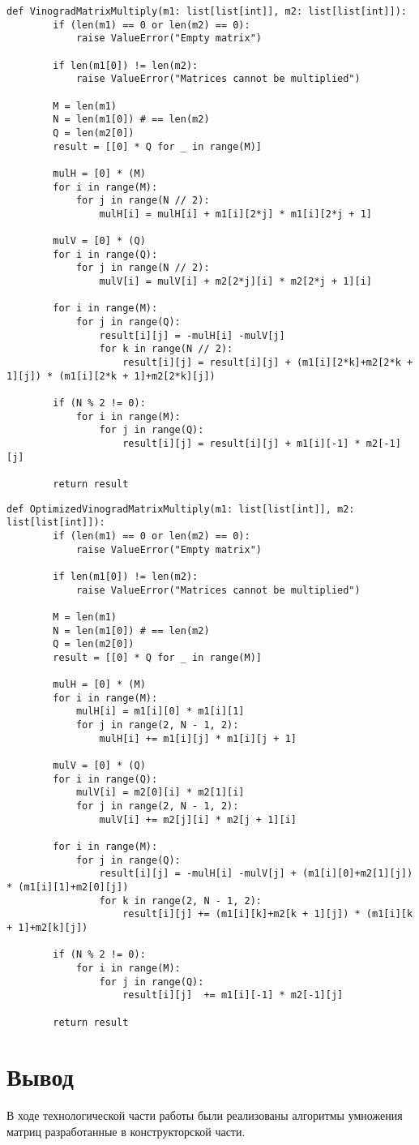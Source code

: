 \begin{lstlisting}[label=vinpy,caption={Алгоритм умножения матриц Винограда}]
	def VinogradMatrixMultiply(m1: list[list[int]], m2: list[list[int]]):
		if (len(m1) == 0 or len(m2) == 0):
			raise ValueError("Empty matrix")
		
		if len(m1[0]) != len(m2):
			raise ValueError("Matrices cannot be multiplied")
		
		M = len(m1)
		N = len(m1[0]) # == len(m2)
		Q = len(m2[0])
		result = [[0] * Q for _ in range(M)]
		
		mulH = [0] * (M)
		for i in range(M):
			for j in range(N // 2):
				mulH[i] = mulH[i] + m1[i][2*j] * m1[i][2*j + 1]
		
		mulV = [0] * (Q)
		for i in range(Q):
			for j in range(N // 2):
				mulV[i] = mulV[i] + m2[2*j][i] * m2[2*j + 1][i]
		
		for i in range(M):
			for j in range(Q):
				result[i][j] = -mulH[i] -mulV[j]
				for k in range(N // 2):
					result[i][j] = result[i][j] + (m1[i][2*k]+m2[2*k + 1][j]) * (m1[i][2*k + 1]+m2[2*k][j])
		
		if (N % 2 != 0):
			for i in range(M):
				for j in range(Q):
					result[i][j] = result[i][j] + m1[i][-1] * m2[-1][j]
		
		return result
\end{lstlisting}

\begin{lstlisting}[label=ovinpy,caption={Оптимизированный алгоритм умножения матриц Винограда}]
	def OptimizedVinogradMatrixMultiply(m1: list[list[int]], m2: list[list[int]]):
		if (len(m1) == 0 or len(m2) == 0):
			raise ValueError("Empty matrix")
		
		if len(m1[0]) != len(m2):
			raise ValueError("Matrices cannot be multiplied")
		
		M = len(m1)
		N = len(m1[0]) # == len(m2)
		Q = len(m2[0])
		result = [[0] * Q for _ in range(M)]
		
		mulH = [0] * (M)
		for i in range(M):
			mulH[i] = m1[i][0] * m1[i][1]
			for j in range(2, N - 1, 2):
				mulH[i] += m1[i][j] * m1[i][j + 1]
		
		mulV = [0] * (Q)
		for i in range(Q):
			mulV[i] = m2[0][i] * m2[1][i]
			for j in range(2, N - 1, 2):
				mulV[i] += m2[j][i] * m2[j + 1][i]
		
		for i in range(M):
			for j in range(Q):
				result[i][j] = -mulH[i] -mulV[j] + (m1[i][0]+m2[1][j]) * (m1[i][1]+m2[0][j])
				for k in range(2, N - 1, 2):
					result[i][j] += (m1[i][k]+m2[k + 1][j]) * (m1[i][k + 1]+m2[k][j])
		
		if (N % 2 != 0):
			for i in range(M):
				for j in range(Q):
					result[i][j]  += m1[i][-1] * m2[-1][j]
		
		return result
\end{lstlisting}


\section*{Вывод}

В ходе технологической части работы были реализованы алгоритмы умножения матриц разработанные в конструкторской части.

\clearpage
